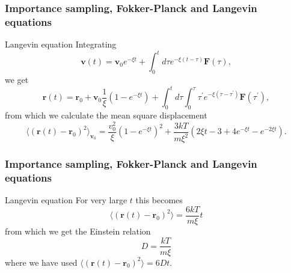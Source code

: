 \documentclass{beamer}
\begin{document}
\begin{frame}
\frametitle{Importance sampling, Fokker-Planck and Langevin equations}

\begin{block}{Langevin equation }
Integrating 
 \[ 
\mathbf{v}(t)=\mathbf{v}_{0}e^{-\xi t}+\int_{0}^{t}d\tau e^{-\xi (t-\tau )}\mathbf{F }(\tau ), 
\] 
we get
\[
\mathbf{r}(t)=\mathbf{r}_{0}+\mathbf{v}_{0}\frac{1}{\xi }(1-e^{-\xi t})+
\int_0^td\tau \int_0^{\tau}\tau ^{\prime } e^{-\xi (\tau -\tau ^{\prime })}\mathbf{F}(\tau ^{\prime }), 
\]
from which we calculate the mean square displacement 
\[
\langle ( \mathbf{r}(t)-\mathbf{r}_{0})^{2}\rangle _{\mathbf{v}_{0}}=\frac{v_0^2}{\xi}(1-e^{-\xi t})^{2}+\frac{3kT}{m\xi ^{2}}(2\xi t-3+4e^{-\xi t}-e^{-2\xi t}). 
\]
\end{block}
\end{frame}

\begin{frame}
\frametitle{Importance sampling, Fokker-Planck and Langevin equations}

\begin{block}{Langevin equation }
For very large $t$ this becomes
\[
\langle (\mathbf{r}(t)-\mathbf{r}_{0})^{2}\rangle =\frac{6kT}{m\xi }t 
\] 
from which we get the Einstein relation  
 \[ 
D= \frac{kT}{m\xi } 
\] 	
where we have used $\langle (\mathbf{r}(t)-\mathbf{r}_{0})^{2}\rangle =6Dt$.
\end{block}
\end{frame}
\end{document}
